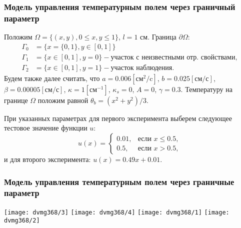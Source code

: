 \begin{frame}
    \frametitle{Модель управления температурным полем через граничный параметр}
    Положим $\Omega = \{(x,y), 0 \leq x,y \leq 1\}$, $l = 1$ см.
    Граница $\partial\Omega$:
    \[
        \begin{aligned}
            \Gamma_0 & = \{x=\{0,1\}, y \in [0,1]\} \\
            \Gamma_1 & = \{x\in [0,1], y=0\}
            - \text{участок с неизвестными отр. свойствами}, \\
            \Gamma_2 & = \{x \in [0,1], y=1\} - \text{участок наблюдения}.
        \end{aligned}
    \]
    Будем также далее считать, что $a = 0.006[\text{см}^2/\text{c}]$,
    $b=0.025[\text{см}/\text{с}]$, $\beta = 0.00005[\text{см}/\text{с}]$,
    $\kappa=1[\text{см}^{-1}]$, $\kappa_s = 0$, $A = 0$, $\gamma = 0.3$.
    Температуру на границе $\Omega$ положим равной $\theta_b = (x^2+y^2)/3$.

    При указанных параметрах для первого эксперимента выберем следующее тестовое
    значение функции $u$:
    \begin{equation*}
        u(x)=
        \begin{cases}
            0.01, & \text{если } x \le 0.5, \\
            0.5, & \text{если } x > 0.5,
        \end{cases}
    \end{equation*}
    и для второго эксперимента:
    $u(x)=0.49x+0.01$.
\end{frame}


\begin{frame}
    \frametitle{Модель управления температурным полем через граничные параметр}
    \centering
    \texttt{[image: dvmg368/3]}
    \texttt{[image: dvmg368/4]}
    \texttt{[image: dvmg368/1]}
    \texttt{[image: dvmg368/2]}
\end{frame}

